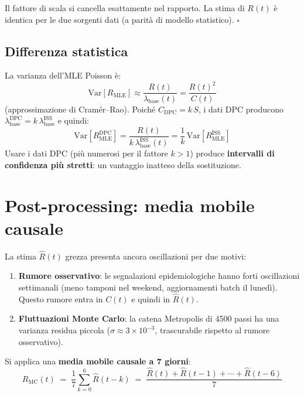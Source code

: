 \documentclass[12pt,a4paper]{article}
\newcommand{\lbase}{\lambda_{\mathrm{base}}}
\begin{document}
Il fattore di scala si cancella esattamente nel rapporto. La stima di $R(t)$ è
identica per le due sorgenti dati (a parità di modello statistico). \qquad $\square$

\subsection{Differenza statistica}

La varianza dell'MLE Poisson è:
\begin{equation}
  \mathrm{Var}[R_{\mathrm{MLE}}] \approx \frac{R(t)}{\lbase(t)} = \frac{R(t)^2}{C(t)}
\end{equation}
(approssimazione di Cramér--Rao). Poiché $C_{\mathrm{DPC}} = k\,S$, i dati DPC producono
$\lbase^{\mathrm{DPC}} = k\,\lbase^{\mathrm{ISS}}$ e quindi:
\begin{equation}
  \mathrm{Var}[R^{\mathrm{DPC}}_{\mathrm{MLE}}] = \frac{R(t)}{k\,\lbase^{\mathrm{ISS}}(t)}
  = \frac{1}{k}\, \mathrm{Var}[R^{\mathrm{ISS}}_{\mathrm{MLE}}]
\end{equation}
Usare i dati DPC (più numerosi per il fattore $k > 1$) produce
\textbf{intervalli di confidenza più stretti}: un vantaggio inatteso della sostituzione.

\section{Post-processing: media mobile causale}

La stima $\widehat{R}(t)$ grezza presenta ancora oscillazioni per due motivi:

\begin{enumerate}
  \item \textbf{Rumore osservativo}: le segnalazioni epidemiologiche hanno forti
        oscillazioni settimanali (meno tamponi nel weekend, aggiornamenti batch il lunedì).
        Questo rumore entra in $C(t)$ e quindi in $\widehat{R}(t)$.

  \item \textbf{Fluttuazioni Monte Carlo}: la catena Metropolis di 4500 passi ha una
        varianza residua piccola ($\sigma \approx 3 \times 10^{-3}$, trascurabile rispetto
        al rumore osservativo).
\end{enumerate}

Si applica una \textbf{media mobile causale a 7 giorni}:
\begin{equation}
  R_{\mathrm{MC}}(t) \;=\; \frac{1}{7}\sum_{k=0}^{6} \widehat{R}(t-k)
  \;=\; \frac{\widehat{R}(t) + \widehat{R}(t-1) + \cdots + \widehat{R}(t-6)}{7}
  \label{eq:smooth}
\end{equation}
\end{document}
